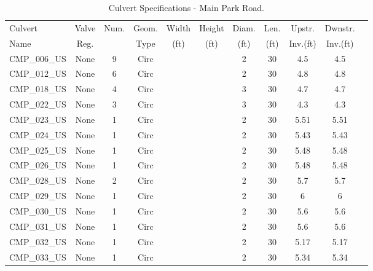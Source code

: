 \begin{table}[]
\caption{Culvert Specifications - Main Park Road.}
\label{tab:culv-specs-MPR}
\begin{tabular}{@{}lcccccccccc@{}}
\toprule
Culvert       & Valve      & Num.     & Geom.& Width  & Height & Diam.    & Len.   & Upstr.    & Dwnstr.    \\
Name          & Reg.       &          & Type & (ft)   & (ft)   & (ft)     & (ft)   & Inv.(ft)  & Inv.(ft)   \\
\midrule
CMP\_006\_US  & None       & 9        & Circ &        &       & 2        & 30     & 4.5       & 4.5        \\
CMP\_012\_US  & None       & 6        & Circ &        &       & 2        & 30     & 4.8       & 4.8        \\
CMP\_018\_US  & None       & 4        & Circ &        &       & 3        & 30     & 4.7       & 4.7        \\
CMP\_022\_US  & None       & 3        & Circ &        &       & 3        & 30     & 4.3       & 4.3        \\
CMP\_023\_US  & None       & 1        & Circ &        &       & 2        & 30     & 5.51      & 5.51       \\
CMP\_024\_US  & None       & 1        & Circ &        &       & 2        & 30     & 5.43      & 5.43       \\
CMP\_025\_US  & None       & 1        & Circ &        &       & 2        & 30     & 5.48      & 5.48       \\
CMP\_026\_US  & None       & 1        & Circ &        &       & 2        & 30     & 5.48      & 5.48       \\
CMP\_028\_US  & None       & 2        & Circ &        &       & 2        & 30     & 5.7       & 5.7        \\
CMP\_029\_US  & None       & 1        & Circ &        &       & 2        & 30     & 6         & 6          \\
CMP\_030\_US  & None       & 1        & Circ &        &       & 2        & 30     & 5.6       & 5.6        \\
CMP\_031\_US  & None       & 1        & Circ &        &       & 2        & 30     & 5.6       & 5.6        \\
CMP\_032\_US  & None       & 1        & Circ &        &       & 2        & 30     & 5.17      & 5.17       \\
CMP\_033\_US  & None       & 1        & Circ &        &       & 2        & 30     & 5.34      & 5.34       \\

\end{tabular}
\end{table}
